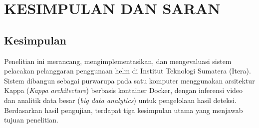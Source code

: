 \chapter{KESIMPULAN DAN SARAN}
\label{chap:kesimpulan}

\section{Kesimpulan}
\label{sec:kesimpulan}

Penelitian ini merancang, mengimplementasikan, dan mengevaluasi sistem pelacakan pelanggaran penggunaan helm di Institut Teknologi Sumatera (Itera). Sistem dibangun sebagai purwarupa pada satu komputer menggunakan arsitektur Kappa (\textit{Kappa architecture}) berbasis kontainer Docker, dengan inferensi video dan analitik data besar (\textit{big data analytics}) untuk pengelolaan hasil deteksi. Berdasarkan hasil pengujian, terdapat tiga kesimpulan utama yang menjawab tujuan penelitian.

